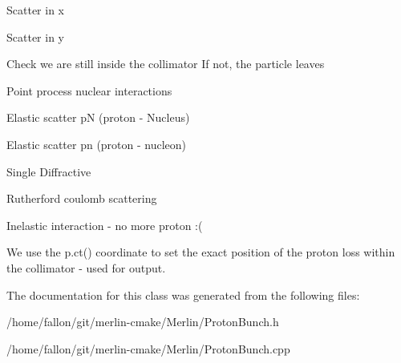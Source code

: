 Scatter in x

Scatter in y

Check we are still inside the collimator If not, the particle leaves

Point process nuclear interactions

Elastic scatter pN (proton -\/ Nucleus)

Elastic scatter pn (proton -\/ nucleon)

Single Diffractive

Rutherford coulomb scattering

Inelastic interaction -\/ no more proton \+:(

We use the p.\+ct() coordinate to set the exact position of the proton loss within the collimator -\/ used for output.

The documentation for this class was generated from the following files\+:\begin{DoxyCompactItemize}
\item 
/home/fallon/git/merlin-\/cmake/\+Merlin/Proton\+Bunch.\+h\item 
/home/fallon/git/merlin-\/cmake/\+Merlin/Proton\+Bunch.\+cpp\end{DoxyCompactItemize}
